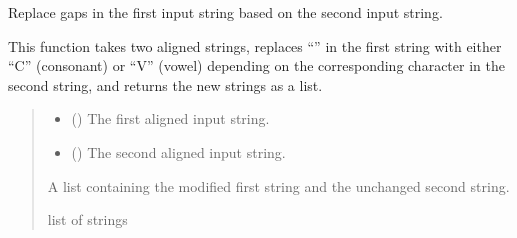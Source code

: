\documentclass[letterpaper,10pt,english]{sphinxmanual}
\begin{document}
\begin{fulllineitems}
\label{\detokenize{documentation:loanpy.utils.cvgaps}}
\pysigstartsignatures
{}
\pysigstopsignatures
\sphinxAtStartPar
Replace gaps in the first input string based on the second input string.

\sphinxAtStartPar
This function takes two aligned strings, replaces “\sphinxhyphen{}” in the first string
with either “C” (consonant) or “V” (vowel) depending on the corresponding
character in the second string, and returns the new strings as a list.
\begin{quote}\begin{description}
\begin{itemize}
\item {} 
\sphinxAtStartPar
{} () \textendash{} The first aligned input string.

\item {} 
\sphinxAtStartPar
{} () \textendash{} The second aligned input string.

\end{itemize}

\sphinxAtStartPar
A list containing the modified first string and the unchanged
second string.

\sphinxAtStartPar
list of strings

\end{description}\end{quote}

\sphinxAtStartPar
{}

\begin{sphinxVerbatim}[commandchars=\\\{\}]
   
 
 
\end{sphinxVerbatim}

\end{fulllineitems}
\end{document}
